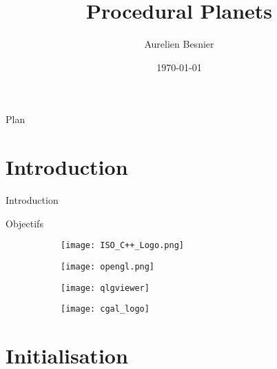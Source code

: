 \documentclass{beamer}
\title{Procedural Planets}
\author{Aurelien Besnier}
\date{\today}
\begin{document}
\maketitle

\begin{frame}{Plan}
    \tableofcontents
\end{frame}

\section{Introduction}

\begin{frame}{Introduction}

\begin{block}{Objectifs}

\end{block}

\begin{figure}[H]
        \begin{subfigure}[b]{0.25\textwidth}
                \centering
                \texttt{[image: ISO\_C++\_Logo.png]}
        \end{subfigure}%
        \begin{subfigure}[b]{0.25\textwidth}
                \centering
                \texttt{[image: opengl.png]}
        \end{subfigure}%
        \begin{subfigure}[b]{0.25\textwidth}
                \centering
                \texttt{[image: qlgviewer]}
        \end{subfigure}%
        \begin{subfigure}[b]{0.25\textwidth}
                \centering
                \texttt{[image: cgal\_logo]}
        \end{subfigure}
\end{figure}
    
\end{frame}


\section{Initialisation}
\end{document}
